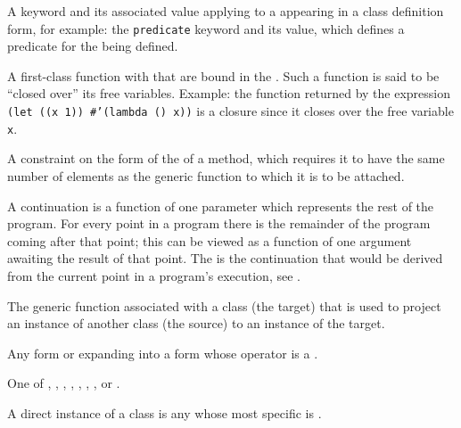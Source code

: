 \begin{optDefinition}
\begin{definitions}
     A keyword and its
    associated value applying to a  appearing in a class definition
    form, for example: the {\tt predicate} keyword and its value, which defines
    a predicate  for the  being defined.

     A first-class function with
     that are bound in the . Such a
    function is said to be ``closed over'' its free variables.  Example: the
    function returned by the expression {\tt (let ((x 1)) \#'(lambda () x))} is
    a closure since it closes over the free variable {\tt x}.

     A constraint on the form of
    the  of a method, which requires it to have the same
    number of elements as the generic function to which it is to be attached.

     A continuation is a
    function of one parameter which represents the rest of the program.  For
    every point in a program there is the remainder of the program coming after
    that point; this can be viewed as a function of one argument awaiting the
    result of that point.  The  is the continuation
    that would be derived from the current point in a program's execution, see
    .

     The
    generic function associated with a class (the target) that is used to
    project an instance of another class (the source) to an instance of the
    target.

     Any form or
     expanding into a form whose operator is a
    .

     One of
    , , ,
    , , ,
    , or .

     A direct instance of a class
     is any  whose most specific  is
    .


\end{definitions}
\end{optDefinition}
